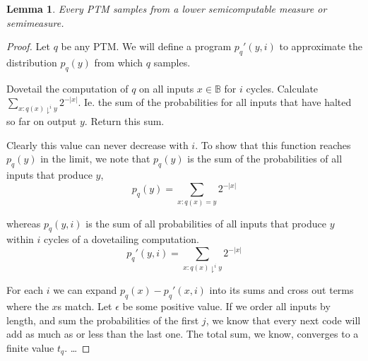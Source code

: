 \documentclass[10pt,a4paper,oneside]{article}
\newtheorem{lma}{Lemma}
\begin{document}
\begin{lma}
Every PTM samples from a lower semicomputable measure or semimeasure.
\end{lma}
\begin{proof}
Let $q$ be any PTM. We will define a program $p_q'(y, i)$ to approximate the distribution $p_q(y)$ from which $q$ samples. 

Dovetail the computation of $q$ on all inputs $x \in \mathbb B$ for $i$ cycles. Calculate $\sum_{x : q(x) \downharpoonright^i y}2^{-|x|}$. Ie. the sum of the probabilities for all inputs that have halted so far on output $y$. Return this sum.

Clearly this value can never decrease with $i$. To show that this function reaches $p_q(y)$ in the limit, we note that $p_q(y)$ is the sum of the probabilities of all inputs that produce $y$,
\[
p_q(y) = \sum_{x : q(x) = y} 2^{-|x|}
\] 

whereas $p_q(y, i)$ is the sum of all probabilities of all inputs that produce $y$ within $i$ cycles of a dovetailing computation.
\[
p_q'(y, i) = \sum_{x : q(x) \downharpoonright^i y} 2^{-|x|}
\]

For each $i$ we can expand $p_q(x) - p_q'(x, i)$ into its sums and cross out terms where the $x$s match. Let $\epsilon$ be some positive value. If we order all inputs by length, and sum the probabilities of the first $j$, we know that every next code will add as much as or less than the last one. The total sum, we know, converges to a finite value $t_q$. \ldots
 
\end{proof}
\end{document}
